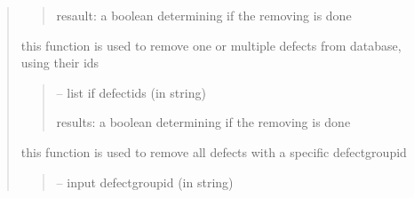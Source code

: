 \documentclass[letterpaper,10pt,english]{sphinxmanual}
\begin{document}
\begin{quote}
\begin{savenotes}
\begin{fulllineitems}
\begin{savenotes}
\begin{fulllineitems}
\begin{quote}
\begin{description}
\sphinxAtStartPar
resault: a boolean determining if the removing is done

\end{description}\end{quote}

\end{fulllineitems}\end{savenotes}


\begin{savenotes}\begin{fulllineitems}
\label{\detokenize{setting/database_utils:oxin.database_utils.dataBaseUtils.remove_defects}}
\pysigstartsignatures
{}
\pysigstopsignatures
\sphinxAtStartPar
this function is used to remove one or multiple defects from database, using their ids
\begin{quote}\begin{description}
\sphinxAtStartPar
{} – list if defect\sphinxhyphen{}ids (in string)

\sphinxAtStartPar
results: a boolean determining if the removing is done

\end{description}\end{quote}

\end{fulllineitems}\end{savenotes}


\begin{savenotes}\begin{fulllineitems}
\label{\detokenize{setting/database_utils:oxin.database_utils.dataBaseUtils.remove_defects_by_group_id}}
\pysigstartsignatures
{}
\pysigstopsignatures
\sphinxAtStartPar
this function is used to remove all defects with a specific defect\sphinxhyphen{}group\sphinxhyphen{}id
\begin{quote}\begin{description}
\sphinxAtStartPar
{} – input defect\sphinxhyphen{}group\sphinxhyphen{}id (in string)


\end{description}
\end{quote}
\end{fulllineitems}
\end{savenotes}
\end{fulllineitems}
\end{savenotes}
\end{quote}
\end{document}

